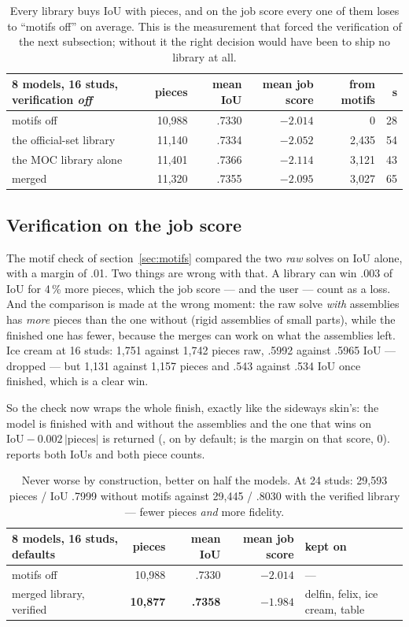 \begin{table}[H]
\centering\small
\begin{tabular}{lrrrrr}
\toprule
8 models, 16 studs, verification \emph{off} & pieces & mean IoU & mean job score & from motifs & s \\
\midrule
motifs off & 10,988 & .7330 & $-2.014$ & 0 & 28 \\
the official-set library & 11,140 & .7334 & $-2.052$ & 2,435 & 54 \\
the MOC library alone & 11,401 & .7366 & $-2.114$ & 3,121 & 43 \\
merged & 11,320 & .7355 & $-2.095$ & 3,027 & 65 \\
\bottomrule
\end{tabular}
\caption{Every library buys IoU with pieces, and on the job score every one of them loses to ``motifs off'' on average. This is
the measurement that forced the verification of the next subsection; without it the right decision would have been to ship no
library at all.}
\end{table}

\subsection{Verification on the job score}\label{sec:motifscore}
The motif check of section~\ref{sec:motifs} compared the two \emph{raw} solves on IoU alone, with a margin of .01. Two things are
wrong with that. A library can win .003 of IoU for 4\,\% more pieces, which the job score --- and the user --- count as a loss. And
the comparison is made at the wrong moment: the raw solve \emph{with} assemblies has \emph{more} pieces than the one without
(rigid assemblies of small parts), while the finished one has fewer, because the merges can work on what the assemblies left. Ice
cream at 16 studs: 1,751 against 1,742 pieces raw, .5992 against .5965 IoU --- dropped --- but 1,131 against 1,157 pieces and .543
against .534 IoU once finished, which is a clear win.

So the check now wraps the whole finish, exactly like the sideways skin's: the model is finished with and without the assemblies
and the one that wins on $\mathrm{IoU} - 0.002\,\lvert\text{pieces}\rvert$ is returned (, on by default;
 is the margin on that score, 0).  reports both IoUs and both piece counts.

\begin{table}[H]
\centering\small
\begin{tabular}{lrrrl}
\toprule
8 models, 16 studs, defaults & pieces & mean IoU & mean job score & kept on \\
\midrule
motifs off & 10,988 & .7330 & $-2.014$ & --- \\
merged library, verified & \textbf{10,877} & \textbf{.7358} & \textbf{$-1.984$} & delfin, felix, ice cream, table \\
\bottomrule
\end{tabular}
\caption{Never worse by construction, better on half the models. At 24 studs: 29,593 pieces / IoU .7999 without motifs against
29,445 / .8030 with the verified library --- fewer pieces \emph{and} more fidelity.}
\end{table}


